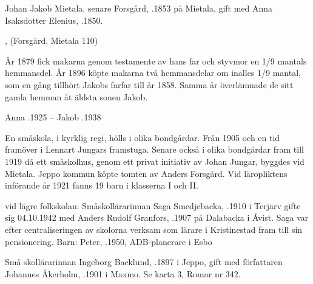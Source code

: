 Johan Jakob Mietala, senare Forsgård, .1853 på Mietala, gift med Anna Isaksdotter Elenius, .1850.
\begin{jhchildren}
  \item {}
  \item {}
  \item {}
  \item {}
  \item {}
  \item {}
  \item {}, (Forsgård, Mietala 110)
\end{jhchildren}
År 1879 fick makarna genom testamente av hans far och styvmor en 1/9 mantals hemmansdel. År 1896 köpte makarna två hemmansdelar om inalles 1/9 mantal, som en gång tillhört Jakobs farfar till år 1858. Samma år överlämnade de sitt gamla hemman åt äldsta sonen Jakob.

Anna .1925  --  Jakob .1938





En småskola, i kyrklig regi, hölls i olika bondgårdar. Från 1905 och en tid framöver i Lennart Jungars framstuga. Senare också i olika bondgårdar fram till 1919 då ett småskolhus, genom ett privat initiativ av Johan Jungar, byggdes vid Mietala. Jeppo kommun köpte tomten av Anders Forsgård. Vid läropliktens införande år 1921 fanns 19 barn i klasserna I och II.


 vid lägre folkskolan:
Småskollärarinnan Saga Smedjebacka, .1910 i Terjärv gifte sig 04.10.1942 med Anders Rudolf Granfors, .1907 på Dalabacka i Åvist. Saga var efter centraliseringen av skolorna verksam som lärare i Kristinestad fram till sin pensionering.
Barn: Peter, .1950, ADB-planerare i Esbo


Små skollärarinnan Ingeborg Backlund, .1897 i Jeppo, gift med författaren Johannes Åkerholm, .1901 i Maxmo. Se karta 3, Romar nr 342.
\begin{jhchildren}
  \item {}
  \item {}
  \item {}
\end{jhchildren}


